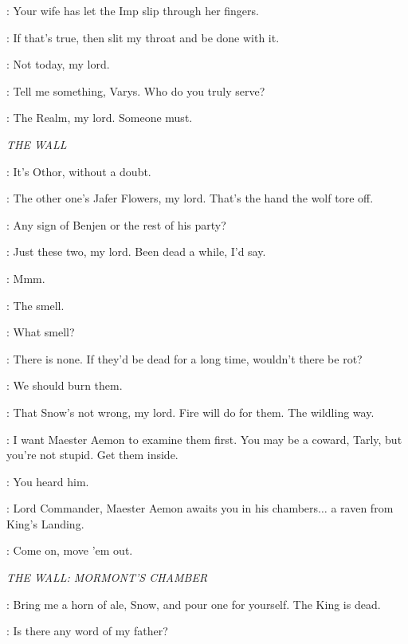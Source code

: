 \VARYS: Your wife has let the Imp slip through her fingers. 

\NED: If that's true, then slit my throat and be done with it. 

\VARYS: Not today, my lord. 

\NED: Tell me something, Varys. Who do you truly serve? 

\VARYS: The Realm, my lord. Someone must. 


\scene

\textit{THE WALL}


\JEOR: It's Othor, without a doubt.

\OTHELLYARWYK:  The other one's Jafer Flowers, my lord. That's the hand the wolf tore off. 

\JEOR: Any sign of Benjen or the rest of his party? 

\JON: Just these two, my lord. Been dead a while, I'd say. 

\JEOR: Mmm. 

\SAM: The smell. 

\OTHELLYARWYK: What smell? 

\SAM: There is none. If they'd be dead for a long time, wouldn't there be rot? 

\JON: We should burn them. 

\OTHELLYARWYK: That Snow's not wrong, my lord. Fire will do for them. The wildling way. 

\JEOR: I want Maester Aemon to examine them first. You may be a coward, Tarly, but you're not stupid. Get them inside. 

\OTHELLYARWYK: You heard him. 


\MESSENGER: Lord Commander, Maester Aemon awaits you in his chambers$\ldots$ a raven from King's Landing. 

\OTHELLYARWYK: Come on, move 'em out. 


\scene

\textit{THE WALL: MORMONT'S CHAMBER} 


\JEOR: Bring me a horn of ale, Snow, and pour one for yourself.  The King is dead. 

\JON: Is there any word of my father? 

